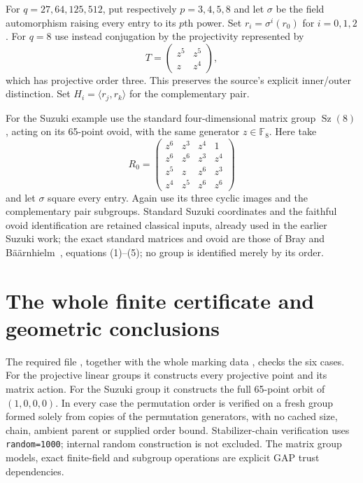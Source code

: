 \documentclass[11pt,a4paper]{article}
\newcommand{\gen}[1]{\langle #1\rangle}
\begin{document}
For $q=27,64,125,512$, put respectively $p=3,4,5,8$ and let $\sigma$
be the field automorphism raising every entry to its $p$th power.
Set $r_i=\sigma^i(r_0)$ for $i=0,1,2$. For $q=8$ use instead conjugation
by the projectivity represented by
\[
 T=\begin{pmatrix}z^5&z^5\\z&z^4\end{pmatrix},
\]
which has projective order three. This preserves the source's explicit
inner/outer distinction. Set $H_i=\gen{r_j,r_k}$ for the complementary pair.

For the Suzuki example use the standard four-dimensional matrix group
$\operatorname{Sz}(8)$, acting on its 65-point ovoid, with the same generator
$z\in\mathbb F_8$. Here take
\[
 R_0=\begin{pmatrix}
z^6&z^3&z^4&1\\ z^6&z^6&z^3&z^4\\
z^5&z&z^6&z^3\\ z^4&z^5&z^6&z^6
\end{pmatrix}
\]
and let $\sigma$ square every entry. Again use its three cyclic images and
the complementary pair subgroups. Standard Suzuki coordinates and the
faithful ovoid identification are retained classical inputs, already used
in the earlier Suzuki work; the exact standard matrices and ovoid are
those of Bray and B\"a\"arnhielm~\cite{BB}, equations (1)--(5); no group is identified merely by its order.

\section{The whole finite certificate and geometric conclusions}
The required file , together with the
whole marking data , checks the six cases. For the
projective linear groups it constructs every projective point and its
matrix action. For the Suzuki group it constructs the full 65-point orbit
of $(1,0,0,0)$. In every case the permutation order is verified on a fresh
group formed solely from copies of the permutation generators, with no
cached size, chain, ambient parent or supplied order bound. Stabilizer-chain
verification uses \texttt{random=1000}; internal random construction is not
excluded. The matrix group models, exact finite-field and subgroup operations
are explicit GAP trust dependencies.
\end{document}
